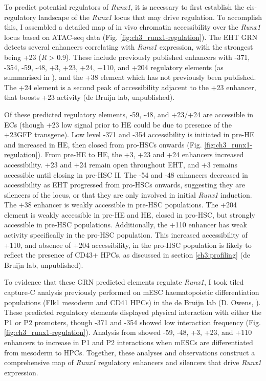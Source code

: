 To predict potential regulators of \textit{Runx1}, it is necessary to first establish the cis-regulatory landscape of the \textit{Runx1} locus that may drive regulation. To accomplish this, I assembled a detailed map of in vivo chromatin accessibility over the \textit{Runx1} locus based on ATAC-seq data (Fig. \ref{fig:ch3_runx1-regulation}). The EHT GRN detects several enhancers correlating with \textit{Runx1} expression, with the strongest being +23 (\textit{R} > 0.9). These include previously published enhancers with -371, -354, -59, -48, +3, +23, +24, +110, and +204 regulatory elements (as summarised in \cite{owens_dynamic_2022}), and the +38 element which has not previously been published. The +24 element is a second peak of accessibility adjacent to the +23 enhancer, that boosts +23 activity (de Bruijn lab, unpublished). 

Of these predicted regulatory elements, -59, -48, and +23/+24 are accessible in ECs (though +23 low signal prior to HE could be due to presence of the +23GFP transgene). Low level -371 and -354 accessibility is initiated in pre-HE and increased in HE, then closed from pro-HSCs onwards (Fig. \ref{fig:ch3_runx1-regulation}). From pre-HE to HE, the +3, +23 and +24 enhancers increased accessibility. +23 and +24 remain open throughout EHT, and +3 remains accessible until closing in pre-HSC II. The -54 and -48 enhancers decreased in accessibility as EHT progressed from pro-HSCs onwards, suggesting they are silencers of the locus, or that they are only involved in initial \textit{Runx1} induction. The +38 enhancer is weakly accessible in pre-HSC populations. The +204 element is weakly accessible in pre-HE and HE, closed in pro-HSC, but strongly accessible in pre-HSC populations. Additionally, the +110 enhancer has weak activity specifically in the pro-HSC population. This increased accessibility of +110, and absence of +204 accessibility, in the pro-HSC population is likely to reflect the presence of CD43+ HPCs, as discussed in section \ref{ch3:profiling} (de Bruijn lab, unpublished). 

To evidence that these GRN predicted elements regulate \textit{Runx1}, I took tiled capture-C analysis previously performed on mESC haematopoietic differentiation populations (Flk1\upos{} mesoderm and CD41\upos{} HPCs) in the de Bruijn lab (D. Owens, \cite{owens_dynamic_2022}). These predicted regulatory elements displayed physical interaction with either the P1 or P2 promoters, though -371 and -354 showed low interaction frequency (Fig. \ref{fig:ch3_runx1-regulation}). Analysis from \cite{owens_dynamic_2022} showed -59, -48, +3, +23, and +110 enhancers to increase in P1 and P2 interactions when mESCs are differentiated from mesoderm to HPCs. Together, these analyses and observations construct a comprehensive map of \textit{Runx1} regulatory enhancers and silencers that drive \textit{Runx1} expression.

